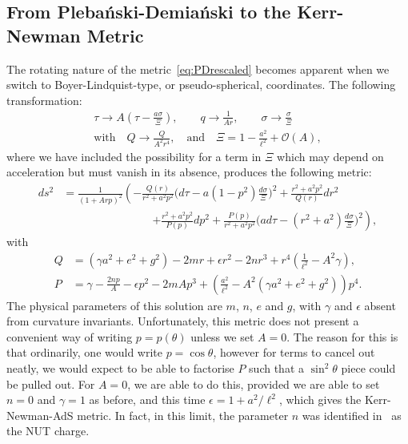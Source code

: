 \documentclass[
twoside,
openright,
frontopenright,
]{dmathesis}
\newcommand{\nn}{\nonumber}
\newcommand{\PD}{Pleba\'nski-Demia\'nski}
\begin{document}
\subsection{From \PD{} to the Kerr-Newman Metric}
\label{sec:PDtoKN}

The rotating nature of the metric~\eqref{eq:PDrescaled} becomes apparent when we
switch to Boyer-Lindquist-type, or pseudo-spherical, coordinates. The following
transformation:
\begin{gather}
  \tau\to A\left(\tau-\frac{a\sigma}{\Xi}\right), \qquad q \to \frac{1}{Ar},
  \qquad \sigma \to \frac{\sigma}{\Xi}\\
  \mbox{with} \quad Q\to
  \frac{Q}{A^2r^4}, \quad \mbox{and} \quad
  \Xi=1-\frac{a^2}{\ell^2}+\mathcal{O}(A),
  \label{eq:PDtoBL}
\end{gather}
where we have included the possibility for a term in $\Xi$ which may depend on
acceleration but must vanish in its absence, produces the following metric:
\begin{align}
  ds^2 &= \frac{1}{(1+Arp)^2}\left( -\frac{Q(r)}{r^2+a^2p^2}\Big(d\tau -
         a(1-p^2) \frac{d\sigma}{\Xi} \Big)^2 + \frac{r^2+a^2p^2}{Q(r)}dr^2
         \right.\nn\\
  &\hspace{8em} \left. + \frac{r^2+a^2p^2}{P(p)}dp^2
  + \frac{P(p)}{r^2+a^2p^2} \Big(ad\tau-(r^2+a^2)
    \frac{d\sigma}{\Xi}\Big)^2\right),
\end{align}
with
\begin{align}
  \label{eq:PDfnrescaledKN}
  Q &= (\gamma a^2+e^2 + g^2) - 2mr + \epsilon r^2 - 2nr^3 + r^4\left(\frac{1}{\ell^2} 
      - A^2\gamma\right),\nn\\ 
  P &=  \gamma - \frac{2np}{A} - \epsilon p^2 -
      2mAp^3 + \left(\frac{a^2}{\ell^2} - A^2(\gamma a^2+e^2+g^2)\right)p^4.
\end{align}
The physical parameters of this solution are $m$, $n$, $e$ and $g$, with
$\gamma$ and $\epsilon$ absent from curvature invariants. Unfortunately, this
metric does not present a convenient way of writing $p=p(\theta)$ unless we set
$A=0$. The reason for this is that ordinarily, one would write $p=\cos{\theta}$,
however for terms to cancel out neatly, we would expect to be able to factorise
$P$ such that a $\sin^2\theta$ piece could be pulled out. For $A=0$, we are able
to do this, provided we are able to set $n=0$ and $\gamma=1$ as before, and this
time $\epsilon=1 + a^2/\ell^2$, which gives the Kerr-Newman-AdS metric. In fact,
in this limit, the parameter $n$ was identified in~\cite{Plebanski:1976gy} as
the NUT charge.
\end{document}
